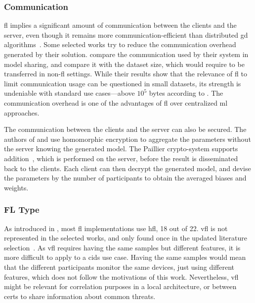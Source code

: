\subsubsection{Communication\label{sec:sota.quali.comm}}

\Gls{fl} implies a significant amount of communication between the clients and the server, even though it remains more communication-efficient than distributed \gls{gd} algorithms~\cite{mcmahan_Communicationefficientlearningdeep_2017}.
Some selected works try to reduce the communication overhead generated by their solution.
\textcite{schneble_Attackdetectionusing_2019,zhang_BlockchainbasedFederatedLearning_2020} compare the communication used by their system in model sharing, and compare it with the dataset size, which would require to be transferred in non-\gls{fl} settings.
While their results show that the relevance of \gls{fl} to limit communication usage can be questioned in small datasets, its strength is undeniable with standard use cases---above \(10^5\) bytes according to \cite{zhang_BlockchainbasedFederatedLearning_2020}.
The communication overhead is one of the advantages of \gls{fl} over centralized \gls{ml} approaches.

The communication between the clients and the server can also be secured.
The authors of \cite{li_DeepFedFederatedDeep_2020} and \cite{li_DistributedNetworkIntrusion_2020} use homomorphic encryption to aggregate the parameters without the server knowing the generated model.
The Paillier crypto-system supports addition~\cite{paillier_PublicKeyCryptosystemsBased_1999}, which is performed on the server, before the result is disseminated back to the clients.
Each client can then decrypt the generated model, and devise the parameters by the number of participants to obtain the averaged biases and weights.


\subsubsection{FL Type\label{sec:sota.quali.type}}

As introduced in , most \gls{fl} implementations use \gls{hfl}, 18 out of 22.
\Gls{vfl} is not represented in the selected works, and only found once in the updated literature selection~\cite{novikova_FederatedLearningIntrusion_2022}.
As \gls{vfl} requires having the same samples but different features, it is more difficult to apply to a \gls{cids} use case.
Having the same samples would mean that the different participants monitor the same devices, just using different features, which does not follow the motivations of this work.
Nevertheless, \gls{vfl} might be relevant for correlation purposes in a local architecture, or between \glspl{cert} to share information about common threats.

